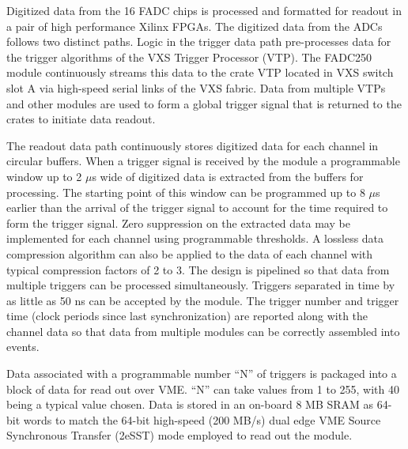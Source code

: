 Digitized data from the 16 FADC chips is processed and formatted for readout in a pair of high performance Xilinx FPGAs. The digitized data from the ADCs follows two distinct paths.  Logic in the trigger data path pre-processes data for the trigger algorithms of the VXS Trigger Processor (VTP). The FADC250 module continuously streams this data to the crate VTP located in VXS switch slot A via high-speed serial links of the VXS fabric.  Data from multiple VTPs and other modules are used to form a global trigger signal that is returned to the crates to initiate data readout.

The readout data path continuously stores digitized data for each channel in circular buffers. When a trigger signal is received by the module a programmable window up to 2 $\mu$s wide of digitized data is extracted from the buffers for processing. The starting point of this window can be programmed up to 8 $\mu$s earlier than the arrival of the trigger signal to account for the time required to form the trigger signal.  Zero suppression on the extracted data may be implemented for each channel using programmable thresholds.  A lossless data compression algorithm can also be applied to the data of each channel with typical compression factors of 2 to 3. The design is pipelined so that data from multiple triggers can be processed simultaneously.  Triggers separated in time by as little as 50 ns can be accepted by the module. The trigger number and trigger time (clock periods since last synchronization) are reported along with the channel data so that data from multiple modules can be correctly assembled into events. 

Data associated with a programmable number ``N'' of triggers is packaged into a block of data for read out over VME.  ``N'' can take values from 1 to 255, with 40 being a typical value chosen.  Data is stored in an on-board 8 MB SRAM as 64-bit words to match the 64-bit high-speed (200 MB/s) dual edge VME Source Synchronous Transfer (2eSST) mode employed to read out the module.  


